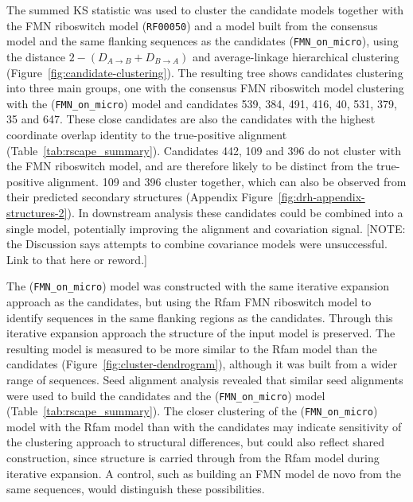 The summed \ac{KS} statistic was used to cluster the candidate models together with the FMN riboswitch model (\texttt{RF00050}) and a model built from the consensus model and the same flanking sequences as the candidates (\texttt{FMN\_on\_micro}), using the distance $2 - (D_{A \rightarrow B} + D_{B \rightarrow A})$ and average-linkage hierarchical clustering (Figure~\ref{fig:candidate-clustering}). 
The resulting tree shows candidates clustering into three main groups, one with the consensus FMN riboswitch model clustering with the (\texttt{FMN\_on\_micro}) model and candidates 539, 384, 491, 416, 40, 531, 379, 35 and 647.
These close candidates are also the candidates with the highest coordinate overlap identity to the true-positive alignment (Table~\ref{tab:rscape_summary}).
Candidates 442, 109 and 396 do not cluster with the FMN riboswitch model, and are therefore likely to be distinct from the true-positive alignment.
109 and 396 cluster together, which can also be observed from their predicted secondary structures (Appendix Figure~\ref{fig:drh-appendix-structures-2}).
In downstream analysis these candidates could be combined into a single model, potentially improving the alignment and covariation signal. [NOTE: the Discussion says attempts to combine covariance models were unsuccessful. Link to that here or reword.]

The (\texttt{FMN\_on\_micro}) model was constructed with the same iterative expansion approach as the candidates, but using the Rfam \ac{FMN} riboswitch model to identify sequences in the same flanking regions as the candidates.
Through this iterative expansion approach the structure of the input model is preserved.
The resulting model is measured to be more similar to the Rfam model than the candidates (Figure~\ref{fig:cluster-dendrogram}), although it was built from a wider range of sequences.
Seed alignment analysis revealed that similar seed alignments were used to build the candidates and the (\texttt{FMN\_on\_micro}) model (Table~\ref{tab:rscape_summary}).
The closer clustering of the (\texttt{FMN\_on\_micro}) model with the Rfam model than with the candidates may indicate sensitivity of the clustering approach to structural differences, but could also reflect shared construction, since structure is carried through from the Rfam model during iterative expansion.
A control, such as building an \ac{FMN} model de novo from the same sequences, would distinguish these possibilities.

